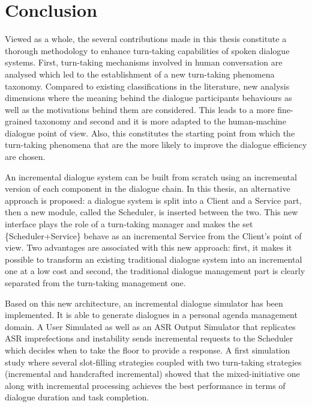 \chapter*{Conclusion}

	Viewed as a whole, the several contributions made in this thesis constitute a thorough methodology to enhance turn-taking capabilities of spoken dialogue systems. First, turn-taking mechanisms involved in human conversation are analysed which led to the establishment of a new turn-taking phenomena taxonomy. Compared to existing classifications in the literature, new analysis dimensions where the meaning behind the dialogue participants behaviours as well as the motivations behind them are considered. This leads to a more fine-grained taxonomy and second and it is more adapted to the human-machine dialogue point of view. Also, this constitutes the starting point from which the turn-taking phenomena that are the more likely to improve the dialogue efficiency are chosen.

        An incremental dialogue system can be built from scratch using an incremental version of each component in the dialogue chain. In this thesis, an alternative approach is proposed: a dialogue system is split into a Client and a Service part, then a new module, called the Scheduler, is inserted between the two. This new interface plays the role of a turn-taking manager and makes the set \{Scheduler+Service\} behave as an incremental Service from the Client's point of view. Two advantages are associated with this new approach: first, it makes it possible to transform an existing traditional dialogue system into an incremental one at a low cost and second, the traditional dialogue management part is clearly separated from the turn-taking management one.

        Based on this new architecture, an incremental dialogue simulator has been implemented. It is able to generate dialogues in a personal agenda management domain. A User Simulated as well as an ASR Output Simulator that replicates ASR imprefections and instability sends incremental requests to the Scheduler which decides when to take the floor to provide a response. A first simulation study where several slot-filling strategies coupled with two turn-taking strategies (incremental and handcrafted incremental) showed that the mixed-initiative one along with incremental processing achieves the best performance in terms of dialogue duration and task completion.

